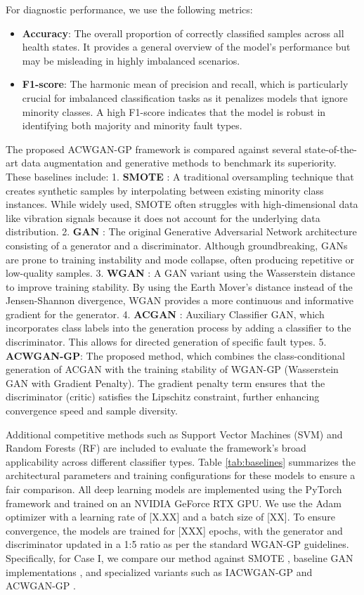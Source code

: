 For diagnostic performance, we use the following metrics:
\begin{itemize}
    \item \textbf{Accuracy}: The overall proportion of correctly classified samples across all health states. It provides a general overview of the model's performance but may be misleading in highly imbalanced scenarios.
    \item \textbf{F1-score}: The harmonic mean of precision and recall, which is particularly crucial for imbalanced classification tasks as it penalizes models that ignore minority classes. A high F1-score indicates that the model is robust in identifying both majority and minority fault types.
\end{itemize}

The proposed ACWGAN-GP framework is compared against several state-of-the-art data augmentation and generative methods to benchmark its superiority. These baselines include:
1. \textbf{SMOTE} \cite{6}: A traditional oversampling technique that creates synthetic samples by interpolating between existing minority class instances. While widely used, SMOTE often struggles with high-dimensional data like vibration signals because it does not account for the underlying data distribution.
2. \textbf{GAN} \cite{1}: The original Generative Adversarial Network architecture consisting of a generator and a discriminator. Although groundbreaking, GANs are prone to training instability and mode collapse, often producing repetitive or low-quality samples.
3. \textbf{WGAN} \cite{2}: A GAN variant using the Wasserstein distance to improve training stability. By using the Earth Mover's distance instead of the Jensen-Shannon divergence, WGAN provides a more continuous and informative gradient for the generator.
4. \textbf{ACGAN} \cite{5}: Auxiliary Classifier GAN, which incorporates class labels into the generation process by adding a classifier to the discriminator. This allows for directed generation of specific fault types.
5. \textbf{ACWGAN-GP}: The proposed method, which combines the class-conditional generation of ACGAN with the training stability of WGAN-GP (Wasserstein GAN with Gradient Penalty). The gradient penalty term ensures that the discriminator (critic) satisfies the Lipschitz constraint, further enhancing convergence speed and sample diversity.

Additional competitive methods such as Support Vector Machines (SVM) \cite{Cortes1995} and Random Forests (RF) \cite{Breiman2001} are included to evaluate the framework's broad applicability across different classifier types. Table \ref{tab:baselines} summarizes the architectural parameters and training configurations for these models to ensure a fair comparison. All deep learning models are implemented using the PyTorch framework and trained on an NVIDIA GeForce RTX GPU. We use the Adam optimizer \cite{Kingma2015} with a learning rate of [X.XX] and a batch size of [XX]. To ensure convergence, the models are trained for [XXX] epochs, with the generator and discriminator updated in a 1:5 ratio as per the standard WGAN-GP guidelines. Specifically, for Case I, we compare our method against SMOTE \cite{6}, baseline GAN implementations \cite{1}, and specialized variants such as IACWGAN-GP \cite{26} and ACWGAN-GP \cite{35}.

